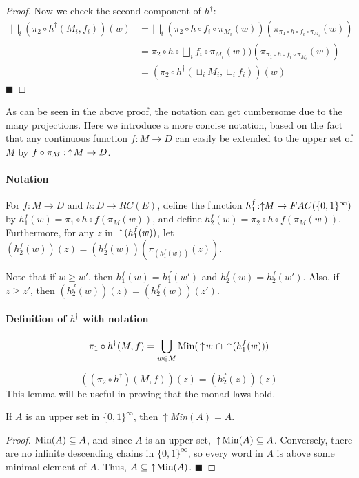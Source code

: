 \begin{proof}
Now we check the second component of $h^\dagger$:
\begin{align*}
\bigsqcup_i (\pi_2\circ h^{\dagger}(M_i,f_i))(w) 
&= \bigsqcup_i (\pi_2\circ h\circ f_i\circ \pi_{M_i}(w))(\pi_{\pi_1\circ h\circ f_i \circ \pi_{M_i}}(w)) \\
&=  \pi_2\circ h\circ \bigsqcup_i f_i\circ \pi_{M_i}(w))(\pi_{\pi_1\circ h\circ f_i \circ \pi_{M_i}}(w)) \\
&= (\pi_2\circ h^{\dagger}(\sqcup_i M_i, \sqcup_i f_i))(w)
\end{align*}
\hfill $\blacksquare$
\end{proof}

As can be seen in the above proof, the notation can get cumbersome due to the many projections.  Here we introduce a more concise notation, based on the fact that any continuous function $f:M\rightarrow D$ can easily be extended to the upper set of $M$ by $f\circ \pi_M:\,\uparrow\! M -> D$.

\paragraph{Notation}
For $f\!:\!M\rightarrow D$ and $h\!:\!D\rightarrow RC(E)$, 
define the function $h_1^f\!:\!\,\uparrow\!\!M\rightarrow FAC(\{0,1\}^\infty)$
by $h_1^f(w) = \pi_1\circ h\circ f(\pi_M(w))$, and 
define $h_2^f(w) = \pi_2\circ h\circ f(\pi_M(w))$.  Furthermore, for any $z$ in 
$\,\uparrow\!(h_1^f(w))$, let $(h_2^f(w))(z) = (h_2^f(w))(\pi_{(h_1^f(w))}(z))$.

Note that if $w\geq w'$, then $h_1^f(w)=h_1^f(w')$ and $h_2^f(w) = h_2^f(w')$.  Also, if $z\geq z'$, 
then $(h_2^f(w))(z) = (h_2^f(w))(z')$.

\paragraph{Definition of $h^\dagger$ with notation}

\[\pi_1\circ h^\dagger(M,f) = \bigcup_{w\in M} \textrm{Min}(\,\uparrow\! w\ \cap 
\,\uparrow\!(h^f_1(w)))\]

\[((\pi_2\circ h^\dagger)(M,f))(z) = (h_2^f(z))(z)\]
This lemma will be useful in proving that the monad laws hold.
\begin{lemma}
If $A$ is an upper set in $\{0,1\}^\infty$, then $\ua\ $\emph{Min}$(A) = A$.
\end{lemma}
\begin{proof}
$\textrm{Min}(A) \subseteq A$, and since $A$ is an upper set, $\,\uparrow\!\textrm{Min}(A) \subseteq A$.  Conversely, there are no infinite descending chains in $\{0,1\}^\infty$, so every word in $A$ is above some minimal element of $A$.  Thus, $A\subseteq\, \,\uparrow\!\textrm{Min}(A)$.
\hfill $\blacksquare$
\end{proof}


